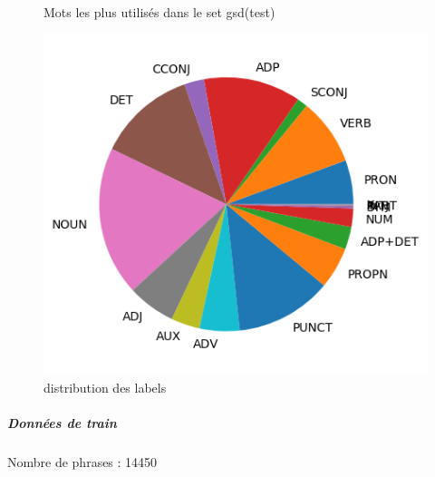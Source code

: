 \begin{figure}[H]
\begin{minipage}{0.48\textwidth}
\begin{tabular}{|l || *{11 }{|c} |}
\end{tabular}
\caption{ Mots les plus utilisés dans le set gsd(test) } \label{Fig:muw}\end{minipage} 
\begin{minipage}{0.48\textwidth} \centering
\includegraphics[width=.7\linewidth]{gsdtest_img.png}
\caption{distribution des labels}
\end{minipage}
\end{figure} \subparagraph{Données de train \\ }  
 Nombre de phrases : 14450\\ 
